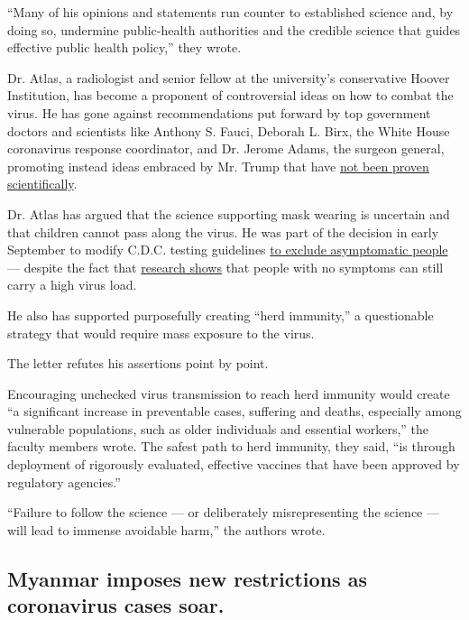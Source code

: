 ``Many of his opinions and statements run counter to established science
and, by doing so, undermine public-health authorities and the credible
science that guides effective public health policy,'' they wrote.

Dr. Atlas, a radiologist and senior fellow at the university's
conservative Hoover Institution, has become a proponent of controversial
ideas on how to combat the virus. He has gone against recommendations
put forward by top government doctors and scientists like Anthony S.
Fauci, Deborah L. Birx, the White House coronavirus response
coordinator, and Dr. Jerome Adams, the surgeon general, promoting
instead ideas embraced by Mr. Trump that have
\href{https://www.nytimes3xbfgragh.onion/2020/04/28/climate/trump-coronavirus-climate-science.html}{not
been proven scientifically}.

Dr. Atlas has argued that the science supporting mask wearing is
uncertain and that children cannot pass along the virus. He was part of
the decision in early September to modify C.D.C. testing guidelines
\href{https://www.nytimes3xbfgragh.onion/2020/08/25/health/covid-19-testing-cdc.html}{to
exclude asymptomatic people} --- despite the fact that
\href{https://www.nytimes3xbfgragh.onion/2020/08/06/health/coronavirus-asymptomatic-transmission.html}{research
shows} that people with no symptoms can still carry a high virus load.

He also has supported purposefully creating ``herd immunity,'' a
questionable strategy that would require mass exposure to the virus.

The letter refutes his assertions point by point.

Encouraging unchecked virus transmission to reach herd immunity would
create ``a significant increase in preventable cases, suffering and
deaths, especially among vulnerable populations, such as older
individuals and essential workers,'' the faculty members wrote. The
safest path to herd immunity, they said, ``is through deployment of
rigorously evaluated, effective vaccines that have been approved by
regulatory agencies.''

``Failure to follow the science --- or deliberately misrepresenting the
science --- will lead to immense avoidable harm,'' the authors wrote.

\hypertarget{myanmar-imposes-new-restrictions-as-coronavirus-cases-soar}{%
\subsection{Myanmar imposes new restrictions as coronavirus cases
soar.}\label{myanmar-imposes-new-restrictions-as-coronavirus-cases-soar}}

